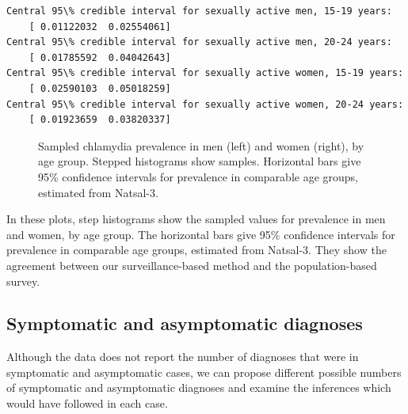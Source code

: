 \documentclass{article}
\begin{document}
    \begin{Verbatim}[commandchars=\\\{\}]
Central 95\% credible interval for sexually active men, 15-19 years: 
 	[ 0.01122032  0.02554061]
Central 95\% credible interval for sexually active men, 20-24 years: 
 	[ 0.01785592  0.04042643]
Central 95\% credible interval for sexually active women, 15-19 years: 
 	[ 0.02590103  0.05018259]
Central 95\% credible interval for sexually active women, 20-24 years: 
 	[ 0.01923659  0.03820337]
    \end{Verbatim}

    \begin{figure}
        \begin{center}\end{center}
        \caption{Sampled chlamydia prevalence in men (left) and women (right), by age group. Stepped histograms show samples. Horizontal bars give 95\% confidence intervals for prevalence in comparable age groups, estimated from Natsal-3.}
        \label{fig:prev_samples_byage}
    \end{figure}
    
    In these plots, step histograms show the sampled values for prevalence
in men and women, by age group. The horizontal bars give 95\% confidence
intervals for prevalence in comparable age groups, estimated from
Natsal-3. They show the agreement between our surveillance-based method
and the population-based survey.

    \subsection{Symptomatic and asymptomatic
diagnoses}\label{symptomatic-and-asymptomatic-diagnoses}

Although the data does not report the number of diagnoses that were in
symptomatic and asymptomatic cases, we can propose different possible
numbers of symptomatic and asymptomatic diagnoses and examine the
inferences which would have followed in each case.
\end{document}
